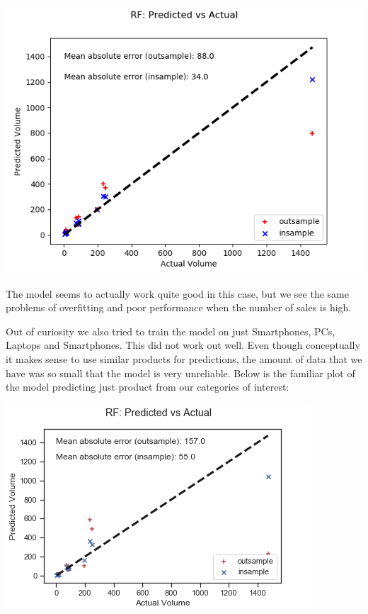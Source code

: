 \documentclass[12pt,a4paper,leqno]{report}
\theoremstyle{plain}
\theoremstyle{definition}
\theoremstyle{remark}
\begin{document}
\bigskip
{
    \centering
    \includegraphics[width=\textwidth,height=\textheight,keepaspectratio]{predictions_final_lim_pred_rf.png}
    \par
}
\bigskip

The model seems to actually work quite good in this case, but we see the same problems of overfitting
and poor performance when the number of sales is high.

Out of curiosity we also tried to train the model on just Smartphones, PCs, Laptops and Smartphones.
This did not work out well. Even though conceptually it makes sense to use similar products for
predictions, the amount of data that we have was so small that the model is very unreliable.
Below is the familiar plot of the model predicting just product from our categories of interest:

\bigskip
{
    \centering
    \includegraphics[width=\textwidth,height=\textheight,keepaspectratio]{predictions_best_lim_pred_train_rf.png}
    \par
}
\bigskip
\end{document}
